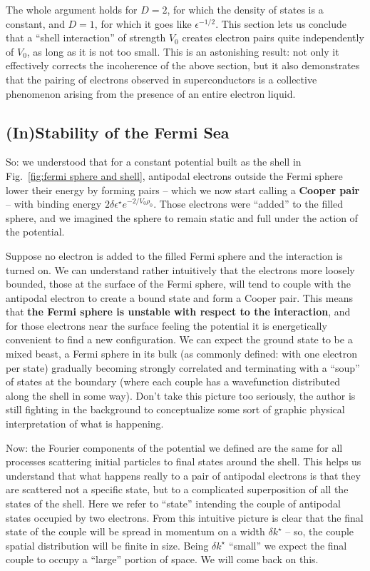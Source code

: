 The whole argument holds for $D=2$, for which the density of states is a constant, and $D=1$, for which it goes like $\epsilon^{-1/2}$. This section lets us conclude that a ``shell interaction'' of strength $V_0$ creates electron pairs quite independently of $V_0$, as long as it is not too small. This is an astonishing result: not only it effectively corrects the incoherence of the above section, but it also demonstrates that the pairing of electrons observed in superconductors is a collective phenomenon arising from the presence of an entire electron liquid.

\subsection{(In)Stability of the Fermi Sea}

So: we understood that for a constant potential built as the shell in Fig.~\ref{fig:fermi sphere and shell}, antipodal electrons outside the Fermi sphere lower their energy by forming pairs -- which we now start calling a \textbf{Cooper pair} -- with binding energy $2\delta\epsilon^\star e^{-2/V_0 \rho_0}$. Those electrons were ``added'' to the filled sphere, and we imagined the sphere to remain static and full under the action of the potential.

Suppose no electron is added to the filled Fermi sphere and the interaction is turned on. We can understand rather intuitively that the electrons more loosely bounded, those at the surface of the Fermi sphere, will tend to couple with the antipodal electron to create a bound state and form a Cooper pair. This means that \textbf{the Fermi sphere is unstable with respect to the interaction}, and for those electrons near the surface feeling the potential it is energetically convenient to find a new configuration. We can expect the ground state to be a mixed beast, a Fermi sphere in its bulk (as commonly defined: with one electron per state) gradually becoming strongly correlated and terminating with a ``soup'' of states at the boundary (where each couple has a wavefunction distributed along the shell in some way). Don't take this picture too seriously, the author is still fighting in the background to conceptualize some sort of graphic physical interpretation of what is happening.

Now: the Fourier components of the potential we defined are the same for all processes scattering initial particles to final states around the shell. This helps us understand that what happens really to a pair of antipodal electrons is that they are scattered not a specific state, but to a complicated superposition of all the states of the shell. Here we refer to ``state'' intending the couple of antipodal states occupied by two electrons. From this intuitive picture is clear that the final state of the couple will be spread in momentum on a width $\delta k^\star$ -- so, the couple spatial distribution will be finite in size. Being $\delta k^\star$ ``small'' we expect the final couple to occupy a ``large'' portion of space. We will come back on this.

